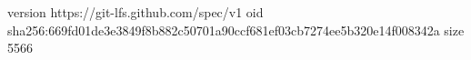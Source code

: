 version https://git-lfs.github.com/spec/v1
oid sha256:669fd01de3e3849f8b882c50701a90ccf681ef03cb7274ee5b320e14f008342a
size 5566
